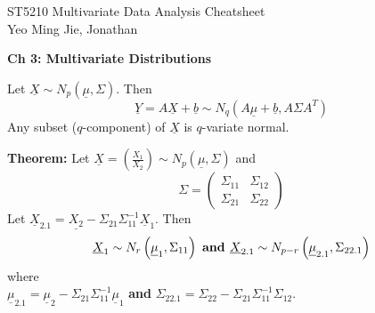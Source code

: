 \documentclass[a4paper]{article}
\newcommand{\subheading}[1]{{\scriptsize\textbf{#1}}}
\begin{document}
\scriptsize                         %
\setlength\parindent{0pt}           %
\setlength{\abovedisplayskip}{3pt}  %
\setlength{\belowdisplayskip}{3pt}  %

\begin{center}
  {\large ST5210 Multivariate Data Analysis Cheatsheet}\\{Yeo Ming Jie, Jonathan}
\end{center}

\begin{multicols*}{4}


\subheading{Ch 3: Multivariate Distributions}

Let $\underline{X} \sim N_p(\underline{\mu},\Sigma)$. Then $$\underline{Y}=A \underline{X}+\underline{b} \sim N_q\left(A \underline{\mu}+\underline{b}, A \Sigma A^T\right)$$
Any subset ($q$-component) of $\underline{X}$ is $q$-variate normal.

\textbf{Theorem:} Let $\underline{X}=\left(\frac{X_1}{X_2}\right) \sim N_p(\underline{\mu}, \Sigma)$ and
$$
\Sigma=\left(\begin{array}{ll}
\Sigma_{11} & \Sigma_{12} \\
\Sigma_{21} & \Sigma_{22}
\end{array}\right)
$$
Let $\underline{X}_{2.1}=\underline{X_2}-\Sigma_{21} \Sigma_{11}^{-1} \underline{X}_1$.
Then
$$
\underline{X}_1 \sim N_r\left(\underline{\mu}_1, \Sigma_{11}\right) \text { \textbf{and }} \underline{X}_{2.1} \sim N_{p-r}\left(\underline{\mu}_{2.1}, \Sigma_{22.1}\right)
$$
where\\
$\underline{\mu}_{2.1}=\underline{\mu}_2-\Sigma_{21} \Sigma_{11}^{-1} \underline{\mu}_1$ \textbf{and} $\Sigma_{22.1}=\Sigma_{22}-\Sigma_{21} \Sigma_{11}^{-1} \Sigma_{12}$. 
\smallskip


\end{multicols*}
\end{document}
